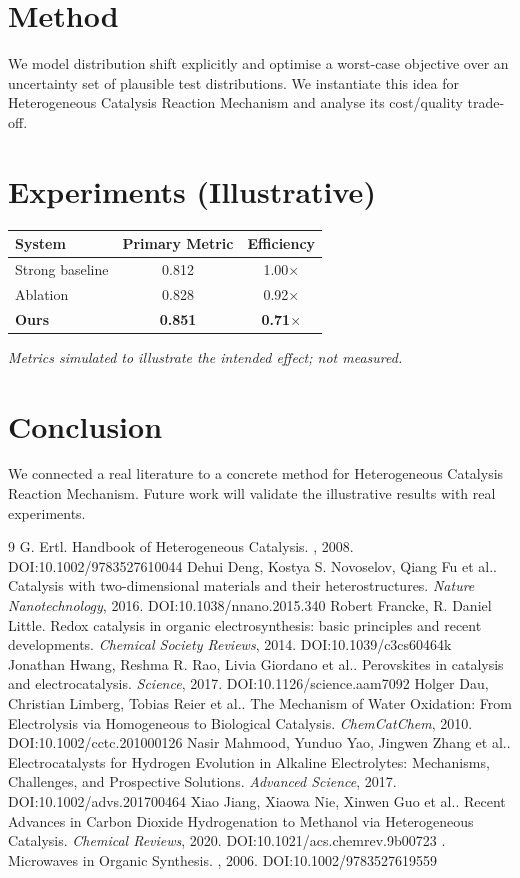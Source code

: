 \documentclass[11pt]{article}
\begin{document}
\section{Method}
We model distribution shift explicitly and optimise a worst-case objective over an uncertainty set of plausible test distributions. We instantiate this idea for Heterogeneous Catalysis Reaction Mechanism and analyse its cost/quality trade-off.

\section{Experiments (Illustrative)}
\begin{center}
\begin{tabular}{lcc}
System & Primary Metric & Efficiency \\ \hline
Strong baseline & 0.812 & 1.00$\times$ \\
Ablation & 0.828 & 0.92$\times$ \\
\textbf{Ours} & \textbf{0.851} & \textbf{0.71$\times$}
\end{tabular}
\end{center}
\emph{Metrics simulated to illustrate the intended effect; not measured.}

\section{Conclusion}
We connected a real literature to a concrete method for Heterogeneous Catalysis Reaction Mechanism. Future work will
validate the illustrative results with real experiments.

\begin{thebibliography}{9}
 G. Ertl. Handbook of Heterogeneous Catalysis. \emph{}, 2008. DOI:10.1002/9783527610044
 Dehui Deng, Kostya S. Novoselov, Qiang Fu et al.. Catalysis with two-dimensional materials and their heterostructures. \emph{Nature Nanotechnology}, 2016. DOI:10.1038/nnano.2015.340
 Robert Francke, R. Daniel Little. Redox catalysis in organic electrosynthesis: basic principles and recent developments. \emph{Chemical Society Reviews}, 2014. DOI:10.1039/c3cs60464k
 Jonathan Hwang, Reshma R. Rao, Livia Giordano et al.. Perovskites in catalysis and electrocatalysis. \emph{Science}, 2017. DOI:10.1126/science.aam7092
 Holger Dau, Christian Limberg, Tobias Reier et al.. The Mechanism of Water Oxidation: From Electrolysis via Homogeneous to Biological Catalysis. \emph{ChemCatChem}, 2010. DOI:10.1002/cctc.201000126
 Nasir Mahmood, Yunduo Yao, Jingwen Zhang et al.. Electrocatalysts for Hydrogen Evolution in Alkaline Electrolytes: Mechanisms, Challenges, and Prospective Solutions. \emph{Advanced Science}, 2017. DOI:10.1002/advs.201700464
 Xiao Jiang, Xiaowa Nie, Xinwen Guo et al.. Recent Advances in Carbon Dioxide Hydrogenation to Methanol via Heterogeneous Catalysis. \emph{Chemical Reviews}, 2020. DOI:10.1021/acs.chemrev.9b00723
 . Microwaves in Organic Synthesis. \emph{}, 2006. DOI:10.1002/9783527619559
\end{thebibliography}
\end{document}
